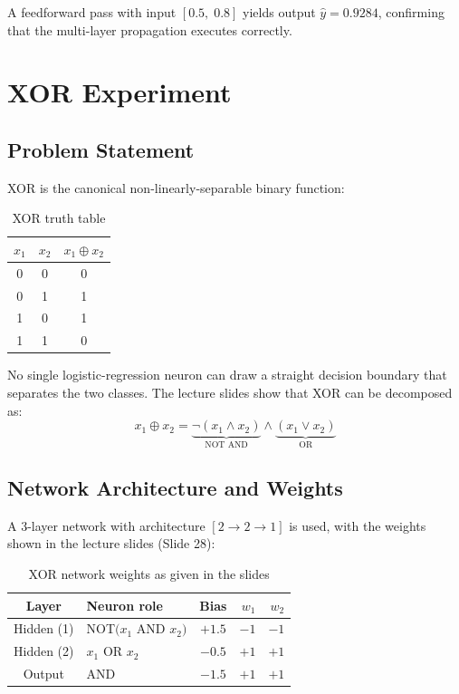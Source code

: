 \documentclass[12pt,a4paper]{article}
\begin{document}
A feedforward pass with input $[0.5,\; 0.8]$ yields output $\hat{y} = 0.9284$,
confirming that the multi-layer propagation executes correctly.

\section{XOR Experiment}

\subsection{Problem Statement}

XOR is the canonical non-linearly-separable binary function:

\begin{table}[H]
\centering
\caption{XOR truth table}
\begin{tabular}{ccc}
\toprule
$x_1$ & $x_2$ & $x_1 \oplus x_2$ \\
\midrule
0 & 0 & 0 \\
0 & 1 & 1 \\
1 & 0 & 1 \\
1 & 1 & 0 \\
\bottomrule
\end{tabular}
\end{table}

No single logistic-regression neuron can draw a straight decision boundary
that separates the two classes.
The lecture slides show that XOR can be decomposed as:
\[
    x_1 \oplus x_2
    = \underbrace{\lnot(x_1 \wedge x_2)}_{\text{NOT AND}} \wedge
      \underbrace{(x_1 \vee x_2)}_{\text{OR}}
\]

\subsection{Network Architecture and Weights}

A 3-layer network with architecture $[2 \to 2 \to 1]$ is used, with the
weights shown in the lecture slides (Slide 28):

\begin{table}[H]
\centering
\caption{XOR network weights as given in the slides}
\begin{tabular}{clcrr}
\toprule
\textbf{Layer} & \textbf{Neuron role} & \textbf{Bias} & $w_1$ & $w_2$ \\
\midrule
Hidden (1) & NOT$(x_1$ AND $x_2)$ & $+1.5$ & $-1$ & $-1$ \\
Hidden (2) & $x_1$ OR $x_2$       & $-0.5$ & $+1$ & $+1$ \\
Output     & AND                  & $-1.5$ & $+1$ & $+1$ \\
\bottomrule
\end{tabular}
\end{table}
\end{document}
